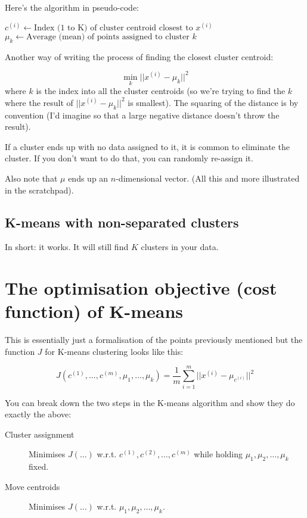 Here's the algorithm in pseudo-code:

\begin{algorithmic}
\REPEAT
		\STATE $c^{(i)} \gets \textrm{Index (1 to K) of cluster centroid closest to } x^{(i)}$
	\ENDFOR
		\STATE $\mu_k \gets \textrm{Average (mean) of points assigned to cluster }k$
	\ENDFOR
{}
\end{algorithmic}

Another way of writing the process of finding the closest cluster centroid:

\[
\min_k ||x^{(i)} - \mu_k||^2
\]
where $k$ is the index into all the cluster centroids (so we're trying to find the $k$ where the result of $||x^{(i)} - \mu_k||^2$ is smallest). The squaring of the distance is by convention (I'd imagine so that a large negative distance doesn't throw the result).

If a cluster ends up with no data assigned to it, it is common to eliminate the cluster. If you don't want to do that, you can randomly re-assign it.

Also note that $\mu$ ends up an $n$-dimensional vector. (All this and more illustrated in the scratchpad).

\subsection{K-means with non-separated clusters}

In short: it works. It will still find $K$ clusters in your data.

\section{The optimisation objective (cost function) of K-means}

This is essentially just a formalisation of the points previously mentioned but the function $J$ for K-means clustering looks like this:

\begin{equation}
J(c^{(1)}, \dots, c^{(m)}, \mu_1, \dots, \mu_k) =
\frac{1}{m} \sum^m_{i = 1}|| x^{(i)} - \mu_{c^{(i)}} ||^2
\end{equation}

You can break down the two steps in the K-means algorithm and show they do exactly the above:

\begin{description}
\item[Cluster assignment] Minimises $J(\dots)$ w.r.t. $c^{(1)}, c^{(2)}, \dots, c^{(m)}$ while holding $\mu_1, \mu_2, \dots, \mu_k$ fixed.
\item[Move centroids] Minimises $J(\dots)$ w.r.t. $\mu_1, \mu_2, \dots, \mu_k$.
\end{description}

